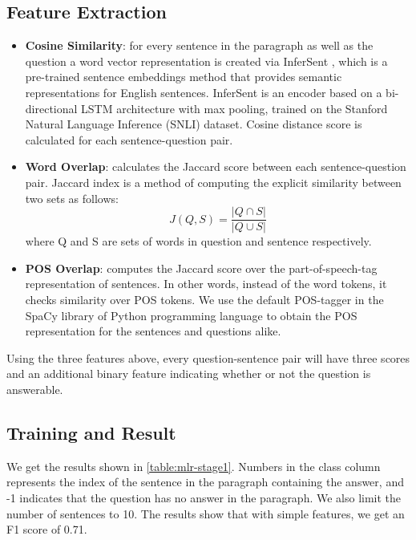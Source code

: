 \subsection{Feature Extraction} 
\begin{itemize}
\item \textbf{Cosine Similarity}: for every sentence in the paragraph as well as the question a word vector representation is created via InferSent \citep{ConneauKSBB17}, which is a pre-trained sentence embeddings method that provides semantic representations for English sentences. InferSent is an encoder based on a bi-directional LSTM architecture with max pooling, trained on the Stanford Natural Language Inference (SNLI) dataset. Cosine distance score is calculated for each sentence-question pair. 
\item \textbf{Word Overlap}: calculates the Jaccard score between each sentence-question pair. Jaccard index is a method of computing the explicit similarity between two sets as follows: 
$$
J(Q,S) = \frac{|Q \cap S|}{|Q \cup S|}
$$
where Q and S are sets of words in question and sentence respectively.

\item \textbf{POS Overlap}: computes the Jaccard score over the part-of-speech-tag representation of sentences. In other words, instead of the word tokens, it checks similarity over POS tokens. We use the default POS-tagger in the SpaCy library of Python programming language to obtain the POS representation for the sentences and questions alike.
\end{itemize}
Using the three features above, every question-sentence pair will have three scores and an additional binary feature indicating whether or not the question is answerable. 

\subsection{Training and Result} 
 We get the results shown in \ref{table:mlr-stage1}. Numbers in the class column represents the index of the sentence in the paragraph containing the answer, and -1 indicates that the question has no answer in the paragraph. We also limit the number of sentences to 10. The results show that with simple features, we get an F1 score of 0.71.

